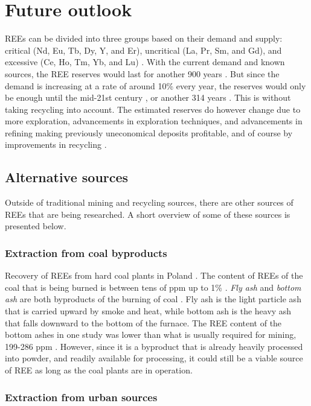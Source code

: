\section{Future outlook}

REEs can be divided into three groups based on their demand and supply: critical (Nd, Eu, Tb, Dy, Y, and Er), uncritical (La, Pr, Sm, and Gd), and excessive (Ce, Ho, Tm, Yb, and Lu) \cite{coalPoland}. With the current demand and known sources, the REE reserves would last for another 900 years \cite{britannica2024}. But since the demand is increasing at a rate of around 10\% every year, the reserves would only be enough until the mid-21st century \cite{britannica2024}, or another 314 years \cite{coalPoland}. This is without taking recycling into account. The estimated reserves do however change due to more exploration, advancements in exploration techniques, and advancements in refining making previously uneconomical deposits profitable, and of course by improvements in recycling \cite{REETechnology}.

\subsection{Alternative sources}

Outside of traditional mining and recycling sources, there are other sources of REEs that are being researched. A short overview of some of these sources is presented below.

\subsubsection{Extraction from coal byproducts}

Recovery of REEs from hard coal plants in Poland \cite{USDoE2024}. The content of REEs of the coal that is being burned is between tens of ppm up to 1\% \cite{coalPoland}. \textit{Fly ash} and \textit{bottom ash} are both byproducts of the burning of coal \cite{ashPalmer}. Fly ash is the light particle ash that is carried upward by smoke and heat, while bottom ash is the heavy ash that falls downward to the bottom of the furnace. The REE content of the bottom ashes in one study was lower than what is usually required for mining, 199-286 ppm \cite{coalPoland}. However, since it is a byproduct that is already heavily processed into powder, and readily available for processing, it could still be a viable source of REE as long as the coal plants are in operation.

\subsubsection{Extraction from urban sources}

